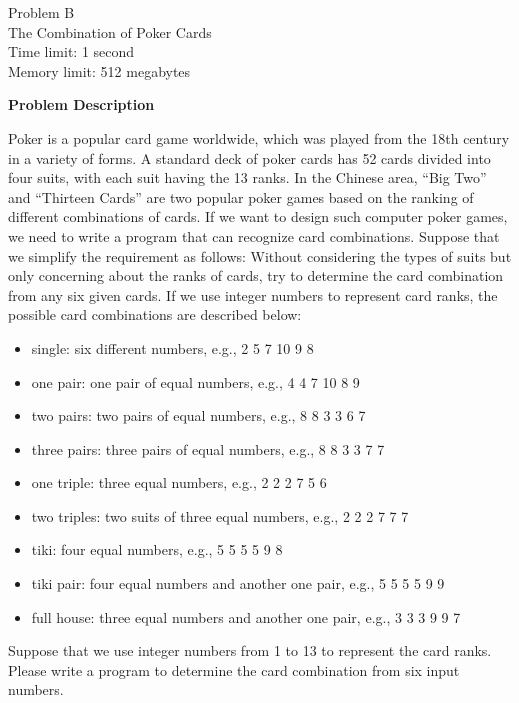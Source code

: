\begin{center}
    {\LARGE Problem B}\vspace{1mm}\\
    {\Large The Combination of Poker Cards}\\
    {Time limit: 1 second}\\
    {Memory limit: 512 megabytes}
\end{center}

\textbf{\large Problem Description}

Poker is a popular card game worldwide, which was played from the 18th century in
a variety of forms. A standard deck of poker cards has 52 cards divided into four suits,
with each suit having the 13 ranks. In the Chinese area, ``Big Two'' and ``Thirteen
Cards'' are two popular poker games based on the ranking of different combinations
of cards. If we want to design such computer poker games, we need to write a
program that can recognize card combinations. Suppose that we simplify the
requirement as follows: Without considering the types of suits but only concerning
about the ranks of cards, try to determine the card combination from any six given
cards. If we use integer numbers to represent card ranks, the possible card
combinations are described below:
\begin{itemize}
\item single: six different numbers, e.g., 2 5 7 10 9 8
\item one pair: one pair of equal numbers, e.g., 4 4 7 10 8 9
\item two pairs: two pairs of equal numbers, e.g., 8 8 3 3 6 7
\item three pairs: three pairs of equal numbers, e.g., 8 8 3 3 7 7
\item one triple: three equal numbers, e.g., 2 2 2 7 5 6
\item two triples: two suits of three equal numbers, e.g., 2 2 2 7 7 7
\item tiki: four equal numbers, e.g., 5 5 5 5 9 8
\item tiki pair: four equal numbers and another one pair, e.g., 5 5 5 5 9 9
\item full house: three equal numbers and another one pair, e.g., 3 3 3 9 9 7
\end{itemize}
Suppose that we use integer numbers from 1 to 13 to represent the card ranks. 
Please write a
program to determine the card combination from six input numbers.

